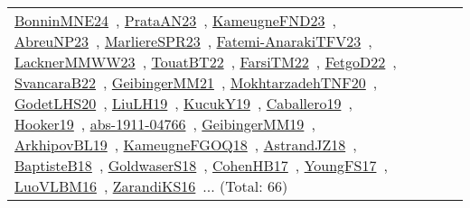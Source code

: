 {\begin{longtable}{lp{3cm}>{\raggedright\arraybackslash}p{6cm}>{\raggedright\arraybackslash}p{6cm}>{\raggedright\arraybackslash}p{8cm}}
\href{../works/BonninMNE24.pdf}{BonninMNE24}~\cite{BonninMNE24}, \href{../works/PrataAN23.pdf}{PrataAN23}~\cite{PrataAN23}, \href{../works/KameugneFND23.pdf}{KameugneFND23}~\cite{KameugneFND23}, \href{../works/AbreuNP23.pdf}{AbreuNP23}~\cite{AbreuNP23}, \href{../works/MarliereSPR23.pdf}{MarliereSPR23}~\cite{MarliereSPR23}, \href{../works/Fatemi-AnarakiTFV23.pdf}{Fatemi-AnarakiTFV23}~\cite{Fatemi-AnarakiTFV23}, \href{../works/LacknerMMWW23.pdf}{LacknerMMWW23}~\cite{LacknerMMWW23}, \href{../works/TouatBT22.pdf}{TouatBT22}~\cite{TouatBT22}, \href{../works/FarsiTM22.pdf}{FarsiTM22}~\cite{FarsiTM22}, \href{../works/FetgoD22.pdf}{FetgoD22}~\cite{FetgoD22}, \href{../works/SvancaraB22.pdf}{SvancaraB22}~\cite{SvancaraB22}, \href{../works/GeibingerMM21.pdf}{GeibingerMM21}~\cite{GeibingerMM21}, \href{../works/MokhtarzadehTNF20.pdf}{MokhtarzadehTNF20}~\cite{MokhtarzadehTNF20}, \href{../works/GodetLHS20.pdf}{GodetLHS20}~\cite{GodetLHS20}, \href{../works/LiuLH19.pdf}{LiuLH19}~\cite{LiuLH19}, \href{../works/KucukY19.pdf}{KucukY19}~\cite{KucukY19}, \href{../works/Caballero19.pdf}{Caballero19}~\cite{Caballero19}, \href{../works/Hooker19.pdf}{Hooker19}~\cite{Hooker19}, \href{../works/abs-1911-04766.pdf}{abs-1911-04766}~\cite{abs-1911-04766}, \href{../works/GeibingerMM19.pdf}{GeibingerMM19}~\cite{GeibingerMM19}, \href{../works/ArkhipovBL19.pdf}{ArkhipovBL19}~\cite{ArkhipovBL19}, \href{../works/KameugneFGOQ18.pdf}{KameugneFGOQ18}~\cite{KameugneFGOQ18}, \href{../works/AstrandJZ18.pdf}{AstrandJZ18}~\cite{AstrandJZ18}, \href{../works/BaptisteB18.pdf}{BaptisteB18}~\cite{BaptisteB18}, \href{../works/GoldwaserS18.pdf}{GoldwaserS18}~\cite{GoldwaserS18}, \href{../works/CohenHB17.pdf}{CohenHB17}~\cite{CohenHB17}, \href{../works/YoungFS17.pdf}{YoungFS17}~\cite{YoungFS17}, \href{../works/LuoVLBM16.pdf}{LuoVLBM16}~\cite{LuoVLBM16}, \href{../works/ZarandiKS16.pdf}{ZarandiKS16}~\cite{ZarandiKS16}... (Total: 66)\\
\end{longtable}
}

